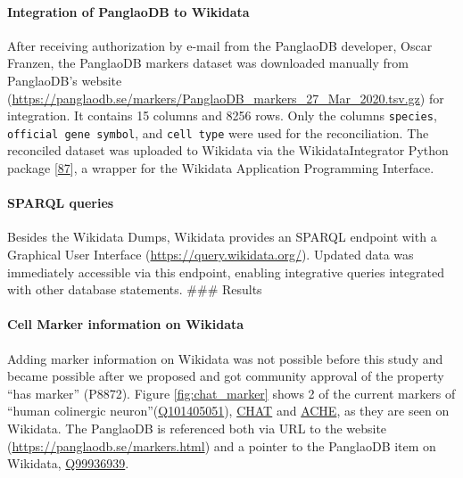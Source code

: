 \hypertarget{integration-of-panglaodb-to-wikidata}{%
\paragraph{Integration of PanglaoDB to Wikidata}\label{integration-of-panglaodb-to-wikidata}}

After receiving authorization by e-mail from the PanglaoDB developer, Oscar Franzen, the PanglaoDB markers dataset was downloaded manually from PanglaoDB's website (\url{https://panglaodb.se/markers/PanglaoDB_markers_27_Mar_2020.tsv.gz}) for integration. It contains 15 columns and 8256 rows. Only the columns \texttt{species}, \texttt{official\ gene\ symbol}, and \texttt{cell\ type} were used for the reconciliation.
The reconciled dataset was uploaded to Wikidata via the WikidataIntegrator Python package {[}\protect\hyperlink{ref-qDI8I4IJ}{87}{]}, a wrapper for the Wikidata Application Programming Interface.

\hypertarget{sparql-queries}{%
\paragraph{SPARQL queries}\label{sparql-queries}}

Besides the Wikidata Dumps, Wikidata provides an SPARQL endpoint with a Graphical User Interface (\url{https://query.wikidata.org/}).
Updated data was immediately accessible via this endpoint, enabling integrative queries integrated with other database statements.
\#\#\# Results

\hypertarget{cell-marker-information-on-wikidata}{%
\paragraph{Cell Marker information on Wikidata}\label{cell-marker-information-on-wikidata}}

Adding marker information on Wikidata was not possible before this study and became possible after we proposed and got community approval of the property ``has marker'' (P8872).
Figure \ref{fig:chat_marker} shows 2 of the current markers of ``human colinergic neuron''(\href{http://www.wikidata.org/entity/Q101405051}{Q101405051}), \href{http://www.wikidata.org/entity/Q14863671}{CHAT} and \href{http://www.wikidata.org/entity/Q407983}{ACHE}, as they are seen on Wikidata.
The PanglaoDB is referenced both via URL to the website (\url{https://panglaodb.se/markers.html}) and a pointer to the PanglaoDB item on Wikidata, \href{http://www.wikidata.org/entity/Q99936939}{Q99936939}.

